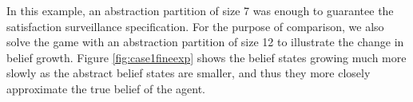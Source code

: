 In this example, an abstraction partition of size 7 was enough to guarantee the satisfaction surveillance specification.  For the purpose of comparison, we also solve the game with  an abstraction partition of size 12  to illustrate the change in belief growth. Figure \ref{fig:case1fineexp} shows the belief states growing much more slowly as the abstract belief states are smaller, and thus they more closely  approximate the true belief of the agent.
\begin{figure}
	\begin{minipage}{5.0cm}
		\centering
\end{minipage}
\end{figure}
